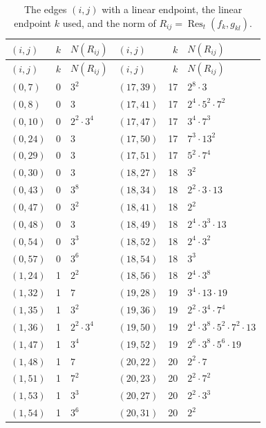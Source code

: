 \documentclass[11pt]{article}
\begin{document}
\begingroup\small
\setlength{\LTcapwidth}{\textwidth}
\begin{longtable}{@{}lrl@{\qquad}lrl@{}}
\caption{The edges $(i,j)$ with a linear endpoint, the linear endpoint $k$ used, and the norm of $R_{ij}=\operatorname{Res}_t(f_k,g_{kl})$.}\label{tab:sep}\\
\hline $(i,j)$ & $k$ & $N(R_{ij})$ & $(i,j)$ & $k$ & $N(R_{ij})$\\\hline\endfirsthead\hline $(i,j)$ & $k$ & $N(R_{ij})$ & $(i,j)$ & $k$ & $N(R_{ij})$\\\hline\endhead\hline\endfoot
$(0,7)$ & 0 & $3^{2}$ & $(17,39)$ & 17 & $2^{8}\cdot 3$\\
$(0,8)$ & 0 & $3$ & $(17,41)$ & 17 & $2^{4}\cdot 5^{2}\cdot 7^{2}$\\
$(0,10)$ & 0 & $2^{2}\cdot 3^{4}$ & $(17,47)$ & 17 & $3^{4}\cdot 7^{3}$\\
$(0,24)$ & 0 & $3$ & $(17,50)$ & 17 & $7^{3}\cdot 13^{2}$\\
$(0,29)$ & 0 & $3$ & $(17,51)$ & 17 & $5^{2}\cdot 7^{4}$\\
$(0,30)$ & 0 & $3$ & $(18,27)$ & 18 & $3^{2}$\\
$(0,43)$ & 0 & $3^{8}$ & $(18,34)$ & 18 & $2^{2}\cdot 3\cdot 13$\\
$(0,47)$ & 0 & $3^{2}$ & $(18,41)$ & 18 & $2^{2}$\\
$(0,48)$ & 0 & $3$ & $(18,49)$ & 18 & $2^{4}\cdot 3^{3}\cdot 13$\\
$(0,54)$ & 0 & $3^{3}$ & $(18,52)$ & 18 & $2^{4}\cdot 3^{2}$\\
$(0,57)$ & 0 & $3^{6}$ & $(18,54)$ & 18 & $3^{3}$\\
$(1,24)$ & 1 & $2^{2}$ & $(18,56)$ & 18 & $2^{4}\cdot 3^{8}$\\
$(1,32)$ & 1 & $7$ & $(19,28)$ & 19 & $3^{4}\cdot 13\cdot 19$\\
$(1,35)$ & 1 & $3^{2}$ & $(19,36)$ & 19 & $2^{2}\cdot 3^{4}\cdot 7^{4}$\\
$(1,36)$ & 1 & $2^{2}\cdot 3^{4}$ & $(19,50)$ & 19 & $2^{4}\cdot 3^{8}\cdot 5^{2}\cdot 7^{2}\cdot 13$\\
$(1,47)$ & 1 & $3^{4}$ & $(19,52)$ & 19 & $2^{6}\cdot 3^{8}\cdot 5^{6}\cdot 19$\\
$(1,48)$ & 1 & $7$ & $(20,22)$ & 20 & $2^{2}\cdot 7$\\
$(1,51)$ & 1 & $7^{2}$ & $(20,23)$ & 20 & $2^{2}\cdot 7^{2}$\\
$(1,53)$ & 1 & $3^{3}$ & $(20,27)$ & 20 & $2^{2}\cdot 3^{3}$\\
$(1,54)$ & 1 & $3^{6}$ & $(20,31)$ & 20 & $2^{2}$\\

\end{longtable}
\end{document}
